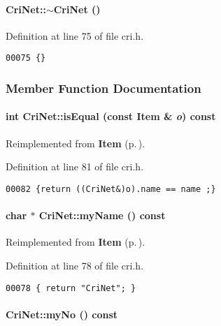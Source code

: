 \paragraph{\setlength{\rightskip}{0pt plus 5cm}Cri\-Net::$\sim$Cri\-Net ()\hspace{0.3cm}{\tt  [inline]}}\hfill



Definition at line 75 of file cri.h.\small\begin{verbatim}00075 {}
\end{verbatim}\normalsize 


\subsubsection{Member Function Documentation}
\label{CriNet_a5}
\paragraph{\setlength{\rightskip}{0pt plus 5cm}int Cri\-Net::is\-Equal (const {\bf Item} \& {\em o}) const\hspace{0.3cm}{\tt  [inline, virtual]}}\hfill



Reimplemented from {\bf Item} {\rm (p.\,\pageref{Item_a5})}.

Definition at line 81 of file cri.h.\small\begin{verbatim}00082 {return ((CriNet&)o).name == name ;}
\end{verbatim}\normalsize 
\label{CriNet_a3}
\paragraph{\setlength{\rightskip}{0pt plus 5cm}char $\ast$ Cri\-Net::my\-Name () const\hspace{0.3cm}{\tt  [inline, virtual]}}\hfill



Reimplemented from {\bf Item} {\rm (p.\,\pageref{Item_a4})}.

Definition at line 78 of file cri.h.\small\begin{verbatim}00078 { return "CriNet"; }
\end{verbatim}\normalsize 
\label{CriNet_a2}
\paragraph{ Cri\-Net::my\-No () const\hspace{0.3cm}{\tt  [inline, virtual]}}\hfill



